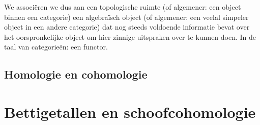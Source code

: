 \documentclass[a4paper,11pt]{article}
\begin{document}
We associ\"eren we dus aan een topologische ruimte (of algemener: een object binnen een categorie) een algebra\"isch object (of algemener: een veelal simpeler object in een andere categorie) dat nog steeds voldoende informatie bevat over het oorspronkelijke object om hier zinnige uitspraken over te kunnen doen. In de taal van categorie\"en: een functor.

\begin{example}
  
\end{example}

\subsection{Homologie en cohomologie}
\label{subsection:homology-and-cohomology}


\section{Bettigetallen en schoofcohomologie}



\end{document}
